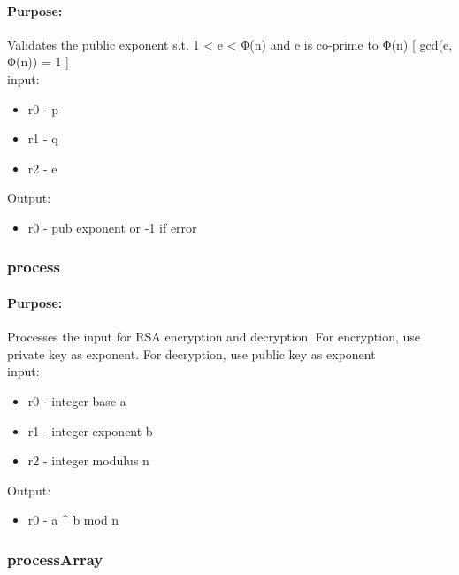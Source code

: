 \documentclass{article}
\begin{document}
            \paragraph*{Purpose:}
                {Validates the public exponent s.t. 1 < e < Φ(n) and e is co-prime to Φ(n) [ gcd(e, Φ(n)) = 1 ] \\}
                input:\begin{itemize}
                    \item r0 - p
                    \item r1 - q
                    \item r2 - e
                \end{itemize}
                Output:\begin{itemize}
                    \item r0 - pub exponent or -1 if error
                \end{itemize}
        \subsubsection{process}
            \paragraph*{Purpose:}
                {Processes the input for RSA encryption and decryption. For encryption, use private key as exponent. For decryption, use public key as exponent \\}
                input:\begin{itemize}
                    \item r0 - integer base a
                    \item r1 - integer exponent b
                    \item r2 - integer modulus n
                \end{itemize}
                Output:\begin{itemize}
                    \item r0 - a \^{}  b mod n
                \end{itemize}
        \subsubsection{processArray}
\end{document}
